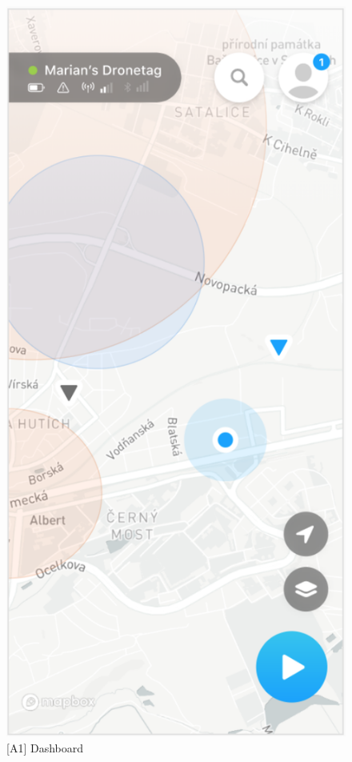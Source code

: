 \begin{figure}
    \centering
    \begin{minipage}{.45\textwidth}
        \centering
        \includegraphics[width=.7\linewidth]{assets/user_interface_design/dashboard/dashboard.png}
        \caption{[A1] Dashboard}
        \label{fig:dashboard}
    \end{minipage}%
    \hspace{.05\linewidth}
    \begin{minipage}{.45\textwidth}
        \centering

\end{minipage}
\end{figure}
